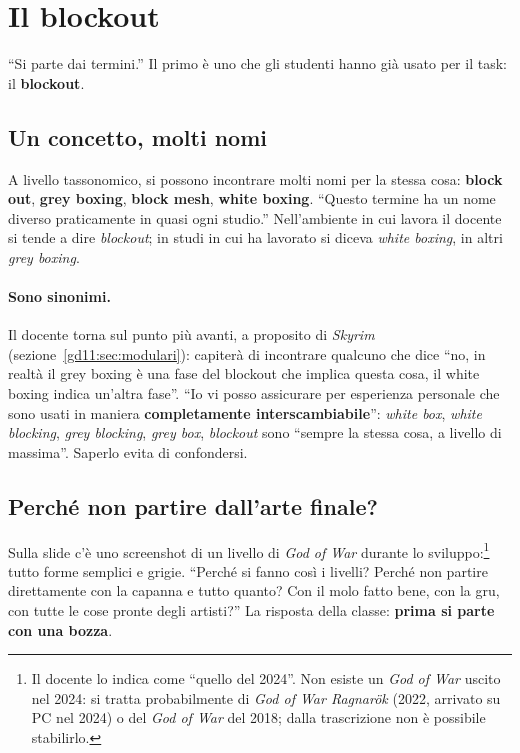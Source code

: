 \section{Il blockout}
\label{gd11:sec:blockout}



``Si parte dai termini.'' Il primo è uno che gli studenti hanno già usato per il
task: il \textbf{blockout}.

\subsection{Un concetto, molti nomi}

A livello tassonomico, si possono incontrare molti nomi per la stessa cosa:
\textbf{block out}, \textbf{grey boxing}, \textbf{block mesh}, \textbf{white
boxing}. ``Questo termine ha un nome diverso praticamente in quasi ogni
studio.'' Nell'ambiente in cui lavora il docente si tende a dire
\emph{blockout}; in studi in cui ha lavorato si diceva \emph{white boxing}, in
altri \emph{grey boxing}.

\paragraph{Sono sinonimi.} Il docente torna sul punto più avanti, a proposito
di \emph{Skyrim} (sezione~\ref{gd11:sec:modulari}): capiterà di incontrare
qualcuno che dice ``no, in realtà il grey boxing è una fase del blockout che
implica questa cosa, il white boxing indica un'altra fase''. ``Io vi posso
assicurare per esperienza personale che sono usati in maniera
\textbf{completamente interscambiabile}'': \emph{white box}, \emph{white
blocking}, \emph{grey blocking}, \emph{grey box}, \emph{blockout} sono ``sempre
la stessa cosa, a livello di massima''. Saperlo evita di confondersi.

\subsection{Perché non partire dall'arte finale?}

Sulla slide c'è uno screenshot di un livello di \emph{God of War} durante lo
sviluppo:\footnote{Il docente lo indica come ``quello del 2024''. Non esiste
un \emph{God of War} uscito nel 2024: si tratta probabilmente di \emph{God of
War Ragnarök} (2022, arrivato su PC nel 2024) o del \emph{God of War} del
2018; dalla trascrizione non è possibile stabilirlo.} tutto forme semplici e
grigie. ``Perché si fanno così i livelli? Perché non partire direttamente con
la capanna e tutto quanto? Con il molo fatto bene, con la gru, con tutte le
cose pronte degli artisti?'' La risposta della classe: \textbf{prima si parte
con una bozza}.


